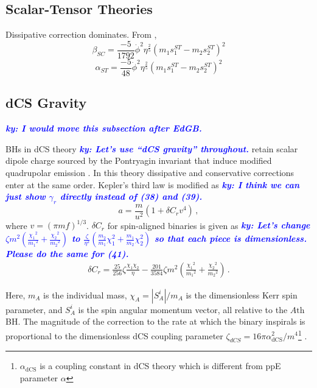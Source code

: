 \documentclass[prd,twocolumn,nofootinbib]{revtex4-1}
\newcommand{\ky}[1]{\textcolor{blue}{\it{\textbf{ky: #1}}} }
\begin{document}
 \subsection{Scalar-Tensor Theories}
 Dissipative correction dominates.  From \cite{Yunes:2016jcc},
 \begin{equation}
 \beta_{SC}=\frac{-5}{1792}\dot{\phi}^2\eta^{\frac{2}{5}}(m_1s_1^{ST}-m_2s_2^{ST})^2
 \end{equation}
 \begin{equation}
 \alpha_{ST}=\frac{-5}{48}\dot{\phi}^2\eta^{\frac{2}{5}}(m_1s_1^{ST}-m_2s_2^{ST})^2
 \end{equation}
 
 \subsection{dCS Gravity}
 
 \ky{I would move this subsection after EdGB.}
 
\hspace{15.5pt}BHs in dCS theory \ky{Let's use ``dCS gravity'' throughout.} retain scalar dipole charge sourced by the Pontryagin invariant that induce modified quadrupolar emission \cite{Yagi:2011xp,Yunes:2016jcc}. In this theory dissipative and conservative corrections enter at the same order. Kepler's third law is modified as \cite{Yagi:2012vf} \ky{I think we can just show $\gamma_r$ directly instead of (38) and (39).}
 \begin{equation}\label{eq:3.3a}
 a=\frac{m}{u^2}(1+\delta C_r v^4)\,,
 \end{equation}
where $v=(\pi m f)^{1/3}$. $\delta C_r$ for  spin-aligned binaries is given as  \ky{Let's change $\zeta m^2 \left(\frac{{\chi_1}^2}{{m_1}^2}+\frac{{\chi_2}^2}{{m_2}^2}\right)$ to $\frac{\zeta}{\eta^2}\left(\frac{m_2}{m_1}\chi_1^2+\frac{m_1}{m_2}\chi_2^2\right)$ so that each piece is dimensionless. Please do the same for (41).}
\begin{align}
\delta C_r=\frac{25}{256}\zeta \frac{\chi_1 \chi_2}{\eta}-\frac{201}{3584}\zeta m^2\left(\frac{{\chi_1}^2}{{m_1}^2}+\frac{{\chi_2}^2}{{m_2}^2}\right)\,.
\end{align} 

Here, $m_A$ is the individual mass, $\chi_A =\left | S_{A}^{i} \right |/m_A$ is the dimensionless Kerr spin parameter, and $S_{A}^{i}$ is the spin angular momentum vector, all relative to the $\mathit{A}\text{th}$ BH. The magnitude of the correction to the rate at which the binary inspirals is proportional to the dimensionless dCS coupling parameter $\zeta_{dCS}=16\pi \alpha_{\text{dCS}}^2/m^4$\footnote{$\alpha_{\text{dCS}}$ is a coupling constant in dCS theory which is different from ppE parameter $\alpha$} .
\end{document}
